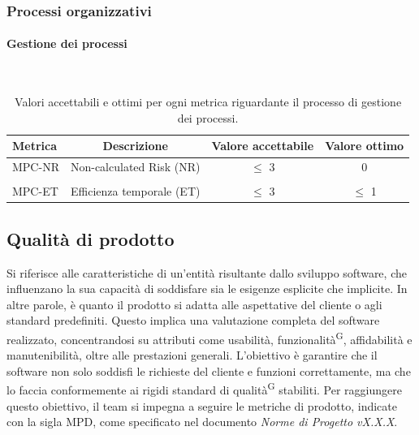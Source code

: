 \documentclass[8pt]{article}
\newcommand{\glossterm}[1]{#1\textsuperscript{G}} %
\newcommand{\subsubsubsection}[1]{\paragraph{#1}\mbox{}\\}
\begin{document}
\subsubsection{Processi organizzativi}
\subsubsubsection{Gestione dei processi}
\begin{table}[H]	
	\centering
	\begin{tabular}{lccc}
		\toprule
		\textbf{Metrica}& \textbf{Descrizione} & \textbf{Valore accettabile} & \textbf{Valore ottimo} \\
		\midrule
		MPC-NR & Non-calculated Risk (NR) & $\leq$ 3 & 0\\\\
		MPC-ET & Efficienza temporale (ET) & $\leq$ 3 & $\leq$ 1 \\
		\bottomrule
	\end{tabular}
	\caption{Valori accettabili e ottimi per ogni metrica riguardante il processo di gestione dei processi.}
	\label{table:Valori accettabili e ottimi per ogni metrica riguardante il processo di gestione dei processi.}
\end{table}
\subsection{Qualità di prodotto}
Si riferisce alle caratteristiche di un'entità risultante dallo sviluppo software, che influenzano la sua capacità di soddisfare sia le esigenze esplicite che implicite. In altre parole, è quanto il prodotto si adatta alle aspettative del cliente o agli standard predefiniti. Questo implica una valutazione completa del software realizzato, concentrandosi su attributi come usabilità, \glossterm{funzionalità}, affidabilità e manutenibilità, oltre alle prestazioni generali. L'obiettivo è garantire che il software non solo soddisfi le richieste del cliente e funzioni correttamente, ma che lo faccia conformemente ai rigidi standard di \glossterm{qualità} stabiliti. Per raggiungere questo obiettivo, il team si impegna a seguire le metriche di prodotto, indicate con la sigla MPD, come specificato nel documento \textit{Norme di Progetto vX.X.X}.
\end{document}
